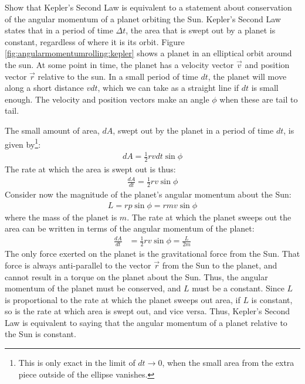 \begin{example}{Show that Kepler's Second Law is equivalent to a statement about conservation of the angular momentum of a planet orbiting the Sun.}
Kepler's Second Law states that in a period of time $\Delta t$, the area that is swept out by a planet is constant, regardless of where it is its orbit. Figure \ref{fig:angularmomentumrolling:kepler} shows a planet in an elliptical orbit around the sun. 
At some point in time, the planet has a velocity vector $\vec v$ and position vector $\vec r$ relative to the sun. In a small period of time $dt$, the planet will move along a short distance $vdt$, which we can take as a straight line if $dt$ is small enough. The velocity and position vectors make an angle $\phi$ when these are tail to tail. 

The small amount of area, $dA$, swept out by the planet in a period of time $dt$, is given by\footnote{This is only exact in the limit of $dt\to 0$, when the small area from the extra piece outside of the ellipse vanishes.}:
\begin{align*}
dA = \frac{1}{2} r vdt\sin\phi
\end{align*}
The rate at which the area is swept out is thus:
\begin{align*}
\frac{dA}{dt} =  \frac{1}{2} r v\sin\phi
\end{align*}
Consider now the magnitude of the planet's angular momentum about the Sun:
\begin{align*}
L = rp\sin\phi = rmv\sin\phi
\end{align*}
where the mass of the planet is $m$. The rate at which the planet sweeps out the area can be written in terms of the angular momentum of the planet:
\begin{align*}
\frac{dA}{dt} &=  \frac{1}{2} r v\sin\phi = \frac{L}{2m}
\end{align*}
The only force exerted on the planet is the gravitational force from the Sun. That force is always anti-parallel to the vector $\vec r$ from the Sun to the planet, and cannot result in a torque on the planet about the Sun. Thus, the angular momentum of the planet must be conserved, and $L$ must be a constant. Since $L$ is proportional to the rate at which the planet sweeps out area, if $L$ is constant, so is the rate at which area is swept out, and vice versa. Thus, Kepler's Second Law is equivalent to saying that the angular momentum of a planet relative to the Sun is constant. 
\end{example}

